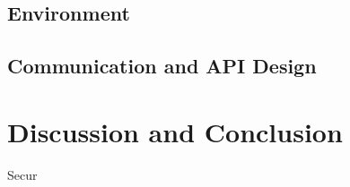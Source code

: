 \documentclass[twoside,twocolumn]{article}
\begin{document}
\subsection{Environment}


\subsection{Communication and API Design}



\section{Discussion and Conclusion}
Secur



{}


\end{document}
